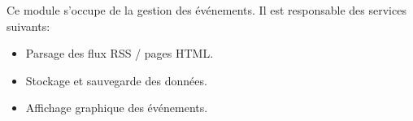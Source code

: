 \begin{figure}[h!]
  \label{fig:events_mod}
  \center
  \setlength\fboxsep{5pt}
  \setlength\fboxrule{0.5pt}
\end{figure}

Ce module s'occupe de la gestion des événements. Il est responsable des services suivants:
\begin{itemize}
\renewcommand{\labelitemi}{$\bullet$}
\item Parsage des flux RSS / pages HTML.
\item Stockage et sauvegarde des données.
\item Affichage graphique des événements.
\end{itemize}
